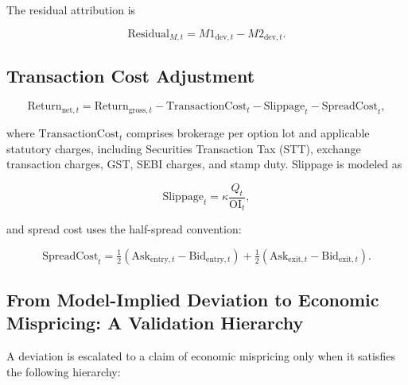 \documentclass[journal]{IEEEtran}
\begin{document}
The residual attribution is

\begin{equation}
\label{eq:residual_m_attribution}
\mathrm{Residual}_{M,t}=M1_{\mathrm{dev},t}-M2_{\mathrm{dev},t}.
\end{equation}

\subsection{Transaction Cost Adjustment}

\begin{equation}
\label{eq:net_return_costs}
\mathrm{Return}_{\mathrm{net},t} = \mathrm{Return}_{\mathrm{gross},t}
- \mathrm{TransactionCost}_t - \mathrm{Slippage}_t
- \mathrm{SpreadCost}_t,
\end{equation}

where $\mathrm{TransactionCost}_t$ comprises brokerage per option lot
and applicable statutory charges, including Securities Transaction Tax
(STT), exchange transaction charges, GST, SEBI charges, and stamp duty.
Slippage is modeled as

\begin{equation}
\label{eq:slippage_cost}
\mathrm{Slippage}_t = \kappa\frac{Q_t}{\mathrm{OI}_t},
\end{equation}

and spread cost uses the half-spread convention:

\begin{equation}
\label{eq:spread_cost}
\mathrm{SpreadCost}_t
= \tfrac{1}{2}\!\left(\mathrm{Ask}_{\mathrm{entry},t}
  -\mathrm{Bid}_{\mathrm{entry},t}\right)
+ \tfrac{1}{2}\!\left(\mathrm{Ask}_{\mathrm{exit},t}
  -\mathrm{Bid}_{\mathrm{exit},t}\right).
\end{equation}

\subsection{From Model-Implied Deviation to Economic Mispricing:
A Validation Hierarchy}

A deviation is escalated to a claim of economic mispricing only when
it satisfies the following hierarchy:
\end{document}
